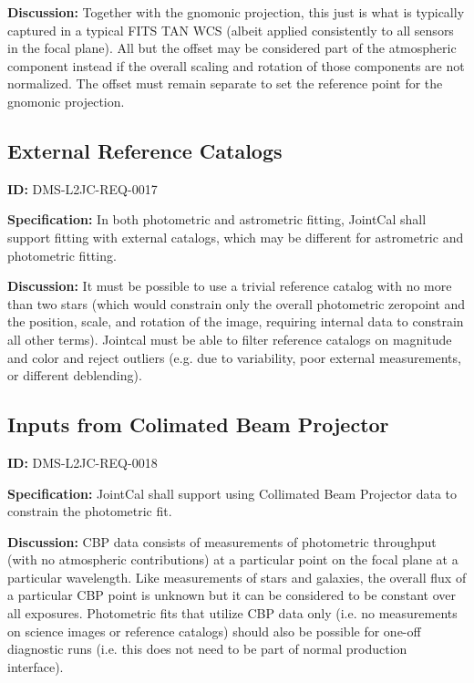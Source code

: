 \documentclass[SE,toc,lsstdraft]{lsstdoc}
\begin{document}
\textbf{Discussion:}
Together with the gnomonic projection, this just is what is typically captured in a typical FITS TAN WCS (albeit applied consistently to all sensors in the focal plane).  All but the offset may be considered part of the atmospheric component instead if the overall scaling and rotation of those components are not normalized.  The offset must remain separate to set the reference point for the gnomonic projection.

\subsection{External Reference Catalogs}

\label{DMS-L2JC-REQ-0017}
\textbf{ID:} DMS-L2JC-REQ-0017

\textbf{Specification:}
In both photometric and astrometric fitting, JointCal shall support fitting with external catalogs, which may be different for astrometric and photometric fitting.

\textbf{Discussion:}
It must be possible to use a trivial reference catalog with no more than two stars (which would constrain only the overall photometric zeropoint and the position, scale, and rotation of the image, requiring internal data to constrain all other terms).  Jointcal must be able to filter reference catalogs on magnitude and color and reject outliers (e.g. due to variability, poor external measurements, or different deblending).

\subsection{Inputs from Colimated Beam Projector}

\label{DMS-L2JC-REQ-0018}
\textbf{ID:} DMS-L2JC-REQ-0018

\textbf{Specification:}
JointCal shall support using Collimated Beam Projector data to constrain the photometric fit.

\textbf{Discussion:}
CBP data consists of measurements of photometric throughput (with no atmospheric contributions) at a particular point on the focal plane at a particular wavelength. Like measurements of stars and galaxies, the overall flux of a particular CBP point is unknown but it can be considered to be constant over all exposures. Photometric fits that utilize CBP data only (i.e. no measurements on science images or reference catalogs) should also be possible for one-off diagnostic runs (i.e. this does not need to be part of normal production interface).
\end{document}
